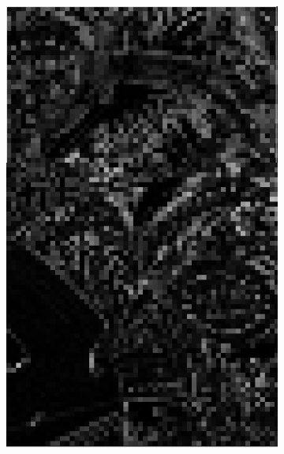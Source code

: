 {\begin{columns}
\begin{figure}[h!]
\begin{subfigure}{0.3\linewidth}
      \includegraphics[height=1.5\textwidth]{figures/residuals_strip.png}
    \end{subfigure}
    \label{fig:pixels}
  \end{figure}


\end{columns}}
